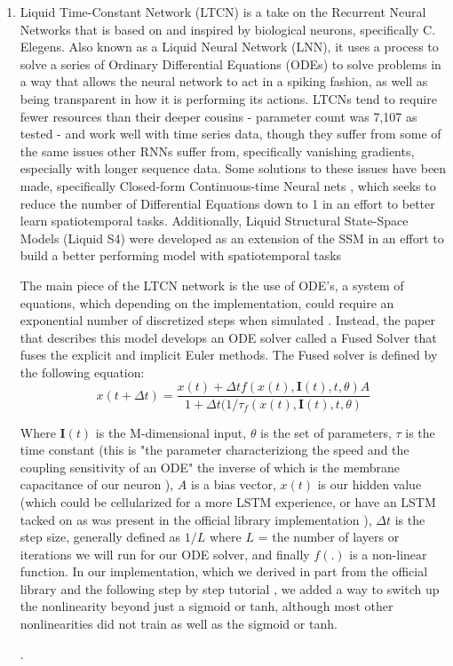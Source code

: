\documentclass[10pt,twocolumn,letterpaper]{article}
\begin{document}
\begin{enumerate}
        \item{Liquid Time-Constant Network (LTCN) \cite{hasani_liquid_2020} is a take on the Recurrent Neural Networks that is based on and inspired by biological neurons, specifically C. Elegens. Also known as a Liquid Neural Network (LNN), it uses a process to solve a series of Ordinary Differential Equations (ODEs) to solve problems in a way that allows the neural network to act in a spiking fashion, as well as being transparent in how it is performing its actions. LTCNs tend to require fewer resources than their deeper cousins - parameter count was 7,107 as tested - and work well with time series data, though they suffer from some of the same issues other RNNs suffer from, specifically vanishing gradients, especially with longer sequence data. Some solutions to these issues have been made, specifically Closed-form Continuous-time Neural nets \cite{CfC_LTC}, which seeks to reduce the number of Differential Equations down to 1 in an effort to better learn spatiotemporal tasks. Additionally, Liquid Structural State-Space Models (Liquid S4) were developed as an extension of the SSM in an effort to build a better performing model with spatiotemporal tasks \cite{hasani2022liquid}

        The main piece of the LTCN network is the use of ODE's, a system of equations, which depending on the implementation, could require an exponential number of discretized steps when simulated \cite{hasani_liquid_2020}. Instead, the paper that describes this model develops an ODE solver called a Fused Solver that fuses the explicit and implicit Euler methods. The Fused solver is defined by the following equation:
\begin{equation}
    x(t + \Delta t) = \frac{x(t) + \Delta t f(x(t), \textbf{I}(t), t, \theta)A}{1 + \Delta t(1/\tau _ f(x(t), \textbf{I}(t), t, \theta)}
\end{equation}

        Where $\textbf{I}(t)$ is the M-dimensional input, $\theta$ is the set of parameters, $\tau$
        is the time constant (this is "the parameter characteriziong the speed and the coupling sensitivity of an ODE" \cite{hasani_liquid_2020} the inverse of which is the membrane capacitance of our neuron \cite{LNN_Tutorial}), $A$ is a bias vector, $x(t)$ is our hidden value (which could be cellularized for a more LSTM experience, or have an LSTM tacked on as was present in the official library implementation \cite{NCP_Github}), $\Delta t$ is the step size, generally defined as $1 / L$ where $L$ = the number of layers or iterations we will run for our ODE solver, and finally $f(.)$ is a non-linear function. In our implementation, which we derived in part from the official library \cite{NCP_Github} and the following step by step tutorial \cite{LNN_Tutorial}, we added a way to switch up the nonlinearity beyond just a sigmoid or tanh, although most other nonlinearities did not train as well as the sigmoid or tanh.
        }.
    
    \end{enumerate}
\end{document}
